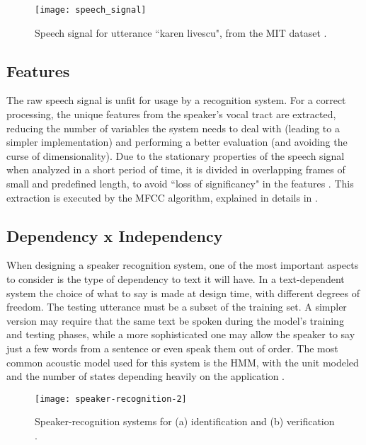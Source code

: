\begin{figure}[ht]
    \centering
    \texttt{[image: speech\_signal]}
    \caption{Speech signal for utterance ``karen livescu", from the MIT dataset .}
    \label{fig:speech_signal}
\end{figure}

\subsection{Features}

The raw speech signal is unfit for usage by a recognition system. For a correct processing, the unique features from the speaker's vocal tract are extracted, reducing the number of variables the system needs to deal with (leading to a simpler implementation) and performing a better evaluation (and avoiding the curse of dimensionality). Due to the stationary properties of the speech signal when analyzed in a short period of time, it is divided in overlapping frames of small and predefined length, to avoid ``loss of significancy" in the features . This extraction is executed by the MFCC algorithm, explained in details in .

\subsection{Dependency x Independency}

When designing a speaker recognition system, one of the most important aspects to consider is the type of dependency to text it will have. In a text-dependent system the choice of what to say is made at design time, with different degrees of freedom. The testing utterance must be a subset of the training set. A simpler version may require that the same text be spoken during the model's training and testing phases, while a more sophisticated one may allow the speaker to say just a few words from a sentence or even speak them out of order. The most common acoustic model used for this system is the HMM, with the unit modeled and the number of states depending heavily on the application .

\begin{figure}[ht]
    \centering
    \texttt{[image: speaker-recognition-2]}
    \caption{Speaker-recognition systems for (a) identification and (b) verification .}
    \label{fig:speaker-recognition-2}
\end{figure}

